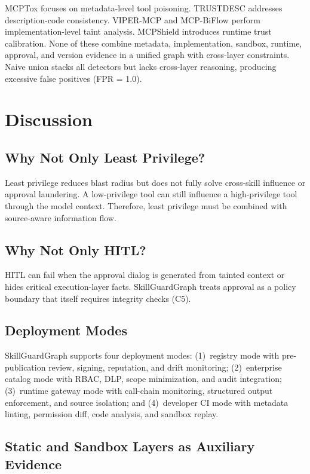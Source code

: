 \documentclass[10pt]{article}
\begin{document}
MCPTox focuses on metadata-level tool poisoning. TRUSTDESC addresses description-code consistency. VIPER-MCP and MCP-BiFlow perform implementation-level taint analysis. MCPShield introduces runtime trust calibration. None of these combine metadata, implementation, sandbox, runtime, approval, and version evidence in a unified graph with cross-layer constraints. Naive union stacks all detectors but lacks cross-layer reasoning, producing excessive false positives (FPR = 1.0).


\section{Discussion}
\label{sec:discussion}

\subsection{Why Not Only Least Privilege?}

Least privilege reduces blast radius but does not fully solve cross-skill influence or approval laundering. A low-privilege tool can still influence a high-privilege tool through the model context. Therefore, least privilege must be combined with source-aware information flow.

\subsection{Why Not Only HITL?}

HITL can fail when the approval dialog is generated from tainted context or hides critical execution-layer facts. SkillGuardGraph treats approval as a policy boundary that itself requires integrity checks (C5).

\subsection{Deployment Modes}

SkillGuardGraph supports four deployment modes: (1)~registry mode with pre-publication review, signing, reputation, and drift monitoring; (2)~enterprise catalog mode with RBAC, DLP, scope minimization, and audit integration; (3)~runtime gateway mode with call-chain monitoring, structured output enforcement, and source isolation; and (4)~developer CI mode with metadata linting, permission diff, code analysis, and sandbox replay.

\subsection{Static and Sandbox Layers as Auxiliary Evidence}
\end{document}
